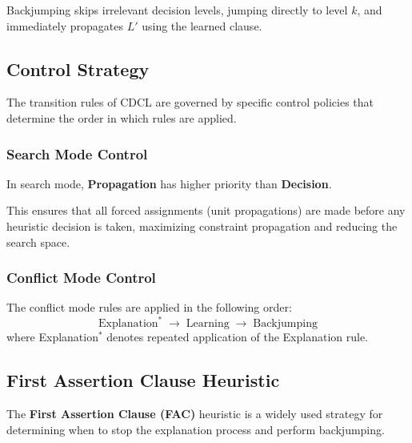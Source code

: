 \documentclass[11pt,a4paper]{article}
\theoremstyle{definition}
\theoremstyle{plain}
\theoremstyle{remark}
\begin{document}
Backjumping skips irrelevant decision levels, jumping directly to level $k$, and immediately propagates $L'$ using the learned clause.

\vspace{1em}

\subsection{Control Strategy}

The transition rules of CDCL are governed by specific control policies that determine the order in which rules are applied.

\subsubsection{Search Mode Control}

\begin{tcolorbox}[colback=blue!5!white,colframe=blue!75!black,title=\textbf{Search Mode Priority}]
In search mode, \textbf{Propagation} has higher priority than \textbf{Decision}.
\end{tcolorbox}

This ensures that all forced assignments (unit propagations) are made before any heuristic decision is taken, maximizing constraint propagation and reducing the search space.

\subsubsection{Conflict Mode Control}

\begin{tcolorbox}[colback=red!5!white,colframe=red!75!black,title=\textbf{Conflict Mode Sequence}]
The conflict mode rules are applied in the following order:
\[
\text{Explanation}^* \;\rightarrow\; \text{Learning} \;\rightarrow\; \text{Backjumping}
\]
where Explanation$^*$ denotes repeated application of the Explanation rule.
\end{tcolorbox}

\subsection{First Assertion Clause Heuristic}

The \textbf{First Assertion Clause (FAC)} heuristic is a widely used strategy for determining when to stop the explanation process and perform backjumping.
\end{document}

